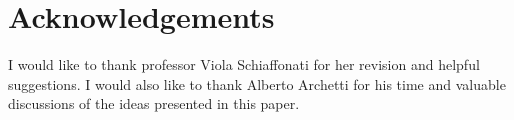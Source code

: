 \section{Acknowledgements}

I would like to thank professor Viola Schiaffonati for her revision and helpful suggestions.
I would also like to thank Alberto Archetti for his time and valuable discussions of the ideas presented in this paper.
